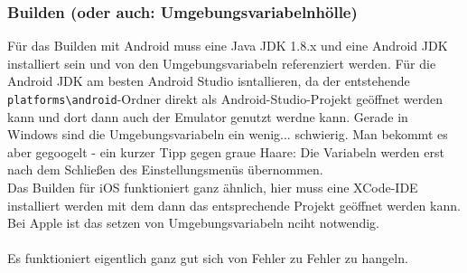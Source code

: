 \subsubsection*{Builden (oder auch: Umgebungsvariabelnhölle)}
Für das Builden mit Android muss eine Java JDK 1.8.x und eine Android JDK installiert sein und von den Umgebungsvariabeln referenziert werden. Für die Android JDK am besten Android Studio isntallieren, da der entstehende \verb|platforms\android|-Ordner direkt als Android-Studio-Projekt geöffnet werden kann und dort dann auch der Emulator genutzt werdne kann. Gerade in Windows sind die Umgebungsvariabeln ein wenig... schwierig. Man bekommt es aber gegoogelt - ein kurzer Tipp gegen graue Haare: Die Variabeln werden erst nach dem Schließen des Einstellungsmenüs übernommen.\\Das Builden für iOS funktioniert ganz ähnlich, hier muss eine XCode-IDE installiert werden mit dem dann das entsprechende Projekt geöffnet werden kann. Bei Apple ist das setzen von Umgebungsvariabeln nciht notwendig.\\\\Es funktioniert eigentlich ganz gut sich von Fehler zu Fehler zu hangeln.